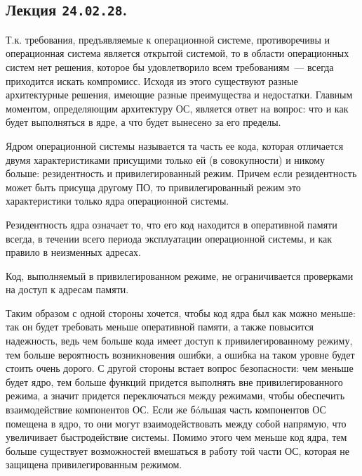 \subsection{%
  Лекция \texttt{24.02.28}.%
}


Т.к. требования, предъявляемые к операционной системе, противоречивы и
операционная система является открытой системой, то в области операционных
систем нет  решения, которое бы удовлетворило всем
требованиям~--- всегда приходится искать компромисс. Исходя из этого существуют
разные архитектурные решения, имеющие разные преимущества и недостатки. Главным
моментом, определяющим архитектуру ОС, является ответ на вопрос: что и как будет
выполняться в ядре, а что будет вынесено за его пределы.

\begin{definition}
  Ядром операционной системы называется та часть ее кода, которая отличается
  двумя характеристиками присущими только ей (в совокупности) и никому больше:
  резидентность и привилегированный режим. Причем если резидентность может быть
  присуща другому ПО, то привилегированный режим это характеристики только ядра
  операционной системы.
\end{definition}

\begin{definition}
  Резидентность ядра означает то, что его код находится в оперативной памяти
  всегда, в течении всего периода эксплуатации операционной системы, и как
  правило в неизменных адресах.
\end{definition}

\begin{definition}
  Код, выполняемый в привилегированном режиме, не ограничивается проверками на
  доступ к адресам памяти.   
\end{definition}

Таким образом с одной стороны хочется, чтобы код ядра был как можно меньше: так
он будет требовать меньше оперативной памяти, а также повысится надежность, ведь
чем больше кода имеет доступ к привилегированному режиму, тем больше вероятность
возникновения ошибки, а ошибка на таком уровне будет стоить очень дорого. С
другой стороны встает вопрос безопасности: чем меньше будет ядро, тем больше
функций придется выполнять вне привилегированного режима, а значит придется
переключаться между режимами, чтобы обеспечить взаимодействие компонентов ОС.
Если же б\'oльшая часть компонентов ОС помещена в ядро, то они могут
взаимодействовать между собой напрямую, что увеличивает быстродействие системы.
Помимо этого чем меньше код ядра, тем больше существует возможностей вмешаться в
работу той части ОС, которая не защищена привилегированным режимом.

